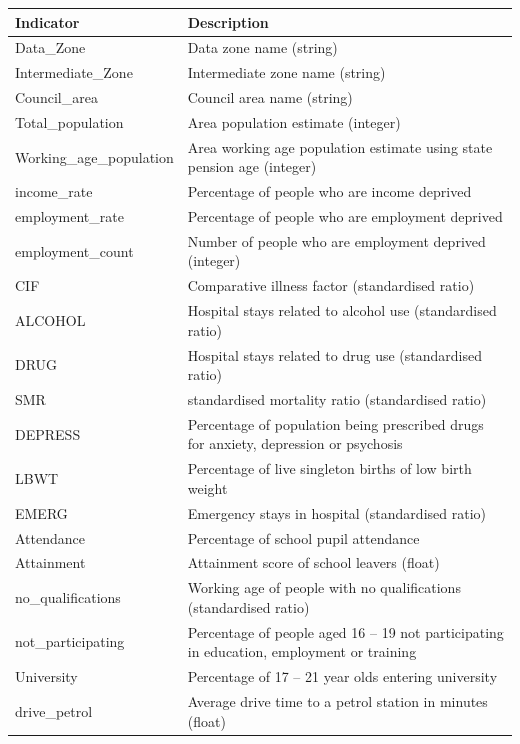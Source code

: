 \documentclass{thesis}
\begin{document}
\begin{table}[ht!]
    \centering
    \begin{tabular}{||l p{100mm}||} 
     \hline
     \textbf{Indicator} & \textbf{Description} \\ [0.5ex] 
     \hline\hline
     Data\_Zone & Data zone name (string) \\
     Intermediate\_Zone & Intermediate zone name (string) \\
     Council\_area & Council area name (string)  \\
     Total\_population & Area population estimate (integer) \\
     Working\_age\_population & Area working age population estimate using state pension age (integer) \\
     income\_rate & Percentage of people who are income deprived \\
     employment\_rate & Percentage of people who are employment deprived \\
     employment\_count & Number of people who are employment deprived (integer) \\
     CIF & Comparative illness factor (standardised ratio\footnotemark) \\
     ALCOHOL & Hospital stays related to alcohol use (standardised ratio) \\
     DRUG & Hospital stays related to drug use (standardised ratio) \\
     SMR & standardised mortality ratio (standardised ratio) \\
     DEPRESS & Percentage of population being prescribed drugs for anxiety, depression or psychosis \\
     LBWT & Percentage of live singleton births of low birth weight \\
     EMERG & Emergency stays in hospital (standardised ratio) \\
     Attendance & Percentage of school pupil attendance \\
     Attainment & Attainment score of school leavers (float) \\
     no\_qualifications & Working age of people with no qualifications (standardised ratio) \\
     not\_participating & Percentage of people aged 16 -- 19 not participating in education, employment or training \\
     University & Percentage of 17 -- 21 year olds entering university \\
     drive\_petrol & Average drive time to a petrol station in minutes (float) \\

\end{tabular}
\end{table}
\end{document}
